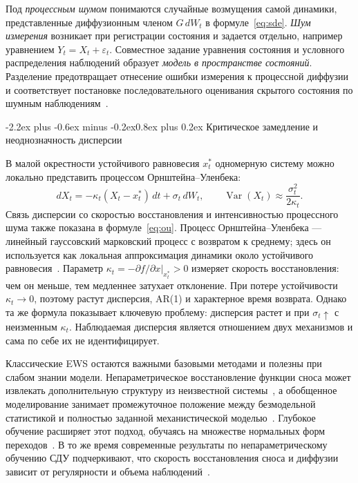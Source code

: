 \documentclass[12pt,a4paper]{article}
\makeatletter
\numberwithin{table}{section}
\numberwithin{figure}{section}
\renewcommand\subsection{\@startsection{subsection}{2}{0pt}
  {-2.2ex plus -0.6ex minus -0.2ex}{0.8ex plus 0.2ex}
  {\normalfont\normalsize\bfseries}}
\newcommand{\term}[1]{\textit{#1}}
\makeatother
\begin{document}
Под \term{процессным шумом} понимаются случайные возмущения самой динамики,
представленные диффузионным членом $G\,dW_t$ в формуле~\eqref{eq:sde}.
\term{Шум измерения} возникает при регистрации состояния и задается отдельно,
например уравнением $Y_t=X_t+\varepsilon_t$. Совместное задание уравнения
состояния и условного распределения наблюдений образует \term{модель в
пространстве состояний}. Разделение предотвращает отнесение ошибки измерения к
процессной диффузии и соответствует постановке последовательного
оценивания скрытого состояния по шумным наблюдениям~\cite{kalman1960}.

\subsection{Критическое замедление и неоднозначность дисперсии}

В малой окрестности устойчивого равновесия $x_t^*$ одномерную систему можно
локально представить процессом Орнштейна--Уленбека:
\begin{equation}
\tag{1.2}
\label{eq:ou}
 dX_t=-\kappa_t(X_t-x_t^*)\,dt+\sigma_t\,dW_t,
 \qquad
 \operatorname{Var}(X_t)\approx\frac{\sigma_t^2}{2\kappa_t}.
\end{equation}
Связь дисперсии со скоростью восстановления и интенсивностью процессного шума
также показана в формуле~\eqref{eq:ou}. Процесс Орнштейна--Уленбека --- линейный гауссовский марковский процесс с
возвратом к среднему; здесь он используется как локальная аппроксимация
динамики около устойчивого равновесия~\cite{carpenter2011}.
Параметр $\kappa_t=-\partial f/\partial x|_{x_t^*}>0$ измеряет скорость
восстановления: чем он меньше, тем медленнее затухает отклонение. При потере
устойчивости $\kappa_t\to0$, поэтому растут дисперсия, AR(1) и характерное время
возврата. Однако та же формула показывает ключевую проблему: дисперсия растет и
при $\sigma_t\uparrow$ с неизменным $\kappa_t$. Наблюдаемая дисперсия является
отношением двух механизмов и сама по себе их не идентифицирует.

Классические EWS остаются важными базовыми методами и полезны при слабом знании
модели. Непараметрическое восстановление функции сноса может извлекать
дополнительную структуру из неизвестной системы~\cite{carpenter2011}, а
обобщенное моделирование занимает промежуточное положение между
безмодельной статистикой и полностью заданной механистической
моделью~\cite{lade2012}. Глубокое обучение расширяет этот подход, обучаясь на
множестве нормальных форм переходов~\cite{bury2021}. В то же время современные
результаты по непараметрическому обучению СДУ подчеркивают, что скорость
восстановления сноса и диффузии зависит от регулярности и объема
наблюдений~\cite{bonalli2026}.
\end{document}
